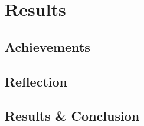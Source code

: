 \chapter{Results}

\section{Achievements}
\lipsum[5-6]
\newpage
\section{Reflection}
\lipsum[7-8]
\section{Results \& Conclusion}
\lipsum[8-9]